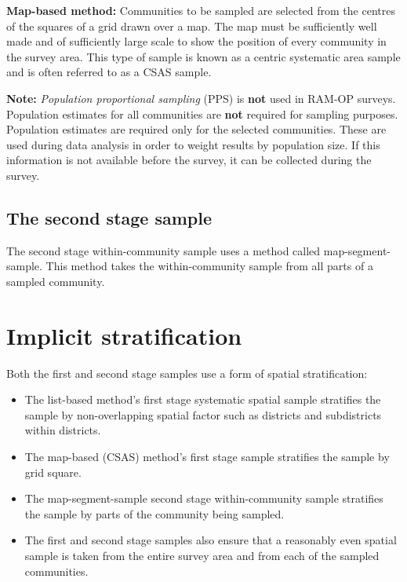 \documentclass[12pt,]{book}
\theoremstyle{definition}
\theoremstyle{definition}
\theoremstyle{definition}
\theoremstyle{remark}
\begin{document}
\textbf{Map-based method:} Communities to be sampled are selected from
the centres of the squares of a grid drawn over a map. The map must be
sufficiently well made and of sufficiently large scale to show the
position of every community in the survey area. This type of sample is
known as a centric systematic area sample and is often referred to as a
CSAS sample.

\textbf{Note:} \emph{Population proportional sampling} (PPS) is
\textbf{not} used in RAM-OP surveys. Population estimates for all
communities are \textbf{not} required for sampling purposes. Population
estimates are required only for the selected communities. These are used
during data analysis in order to weight results by population size. If
this information is not available before the survey, it can be collected
during the survey.

\hypertarget{the-second-stage-sample}{%
\subsection{The second stage sample}\label{the-second-stage-sample}}

The second stage within-community sample uses a method called
map-segment-sample. This method takes the within-community sample from
all parts of a sampled community.

\newpage

\hypertarget{implicit-stratification}{%
\section{Implicit stratification}\label{implicit-stratification}}

Both the first and second stage samples use a form of spatial
stratification:

\begin{itemize}
\item
  The list-based method's first stage systematic spatial sample
  stratifies the sample by non-overlapping spatial factor such as
  districts and subdistricts within districts.
\item
  The map-based (CSAS) method's first stage sample stratifies the sample
  by grid square.
\item
  The map-segment-sample second stage within-community sample stratifies
  the sample by parts of the community being sampled.
\item
  The first and second stage samples also ensure that a reasonably even
  spatial sample is taken from the entire survey area and from each of
  the sampled communities.
\end{itemize}
\end{document}
